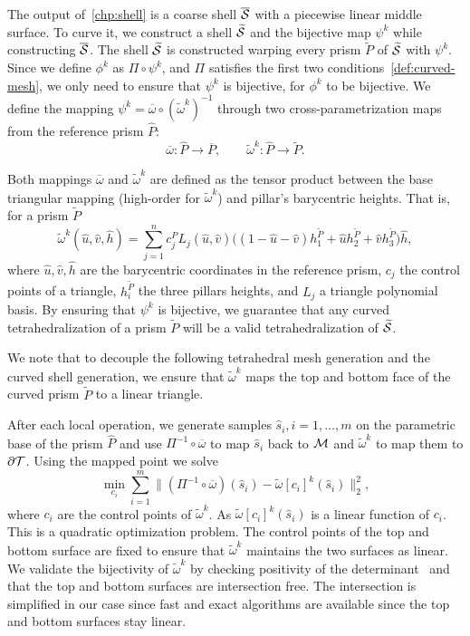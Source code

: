 The output of~\ref{chp:shell} is a coarse shell $\overline{\mathcal{S}}$ with {a} piecewise linear middle surface. To curve it, we construct a shell $\widetilde{\mathcal{S}}$ and the bijective map $\psi^k$ while constructing $\overline{\mathcal{S}}$. 
The shell $\widetilde{\mathcal{S}}$ is constructed warping every prism $\widetilde P$ of $\widetilde{\mathcal{S}}$ with $\psi^k$. Since we define $\phi^k$ as  $\Pi \circ \psi^k$, and $\Pi$ satisfies the first two conditions~\ref{def:curved-mesh}, we only need to ensure that $\psi^k$ is bijective, for $\phi^k$ to be bijective.  We define the mapping $\psi^k = \overline\omega\circ(\widetilde\omega^k)^{-1}$ {through} two {cross-parametrization} maps from the reference prism $\hat P$: 
\[
\overline\omega \colon \hat P \to \overline P, \qquad
\widetilde\omega^k \colon \hat P \to \widetilde P.
\]

Both mappings $\overline\omega$ and $\widetilde\omega^k$ are defined as the tensor product between the base triangular mapping (high-order for $\widetilde\omega^k$) and pillar's {barycentric} heights. That is, for a prism $\widetilde P$
\[
\widetilde\omega^k (\hat u,\hat v, \hat h) = 
\sum_{j=1}^n c_j^P L_j(\hat u,\hat v) \big((1-\hat u - \hat v)  h_1^{\widetilde P}+ \hat u h_2^{\widetilde P} + \hat v  h_3^{\widetilde P}\big)\hat h,
\]
where $\hat u,\hat v,\hat h$ are the barycentric coordinates in the reference prism, $c_j$ the control points of a triangle, $h_i^{\widetilde P}$ the three pillars heights, and $L_j$ a triangle polynomial basis.
By ensuring that $\psi^k$ is bijective, we guarantee that any curved tetrahedralization of a prism $\widetilde P$ will be a valid tetrahedralization of $\widetilde{\mathcal{S}}$.

We note that to decouple the following tetrahedral mesh generation and the curved shell generation, we ensure that $\widetilde\omega^k$ maps the top and bottom face of the curved prism $\widetilde P$ to a linear triangle.

After each local operation, we generate samples $\hat s_i, i=1,\dots,m$ on the parametric base of the prism $\hat P$ and use $\Pi^{-1}\circ \overline\omega$ to map $\hat s_i$ back to $\mathcal{M}$ and $\widetilde \omega^k$ to map them to $\partial\mathcal{T}$. Using the mapped point we solve
\[
\min_{c_i} \sum_{i=1}^m \|
(\Pi^{-1}\circ \overline\omega)(\hat s_i) - 
\widetilde \omega[c_i]^k(\hat s_i)
\|_2^2,
\]
where $c_i$ are the control points of $\widetilde\omega^k$. As $\widetilde \omega[c_i]^k(\hat s_i)$ is a linear function of $c_i$. This is a quadratic optimization problem.
The control points of the top and bottom surface are fixed to ensure that $\widetilde\omega^k$ maintains the two surfaces as linear. We validate the bijectivity of
$\widetilde\omega^k$ by checking positivity of the determinant~\cite{johnen2013geometrical} and that the top and bottom surfaces are intersection free. The intersection is simplified in our case since fast and exact algorithms\cite{guigue2003fast} are available since the top and bottom surfaces stay linear.



